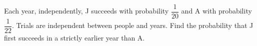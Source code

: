 Each year, independently, J succeeds with probability $\dfrac{1}{20}$ and A with probability $\dfrac{1}{22}$. Trials are independent between people and years. Find the probability that J first succeeds in a strictly earlier year than A.
